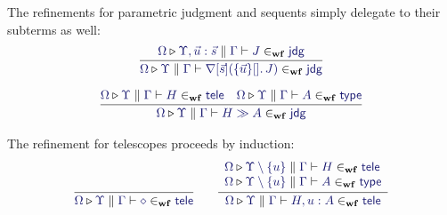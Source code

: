 \documentclass[11pt]{article}
\theoremstyle{definition}
\theoremstyle{remark}
\numberwithin{equation}{section}
\def\IModeColorName{MidnightBlue}
\newcommand\IMode[1]{{\color{\IModeColorName}{#1}}}
\newcommand\MkSet[1]{\left\{#1\right\}}
\newcommand\MkBTm[3]{\{#1\}[#2].\, #3}
\newcommand\IsWf[5]{%
  \IMode{#1}\triangleright%
  \IMode{#2}\parallel%
  \IMode{#3}\vdash%
  \IMode{#4}\in_{\mathbf{wf}}\IMode{#5}%
}
\newcommand\App[2]{#1(#2)}
\begin{document}
The refinements for parametric judgment and sequents simply delegate to their
subterms as well:
\begin{gather*}
  \infer{
    \IsWf{\Omega}{\Upsilon}{\Gamma}{
      \App{\OpNabla{\vec{s}}}{
        \MkBTm{\vec{u}}{}{J}
      }
    }{\SortJdg}
  }{
    \IsWf{\Omega}{\Upsilon,\vec{u}:\vec{s}}{\Gamma}{J}{\SortJdg}
  }\\[6pt]
  \infer{
    \IsWf{\Omega}{\Upsilon}{\Gamma}{
      H\gg A
    }{\SortJdg}
  }{
    \IsWf{\Omega}{\Upsilon}{\Gamma}{H}{\SortTele} &
    \IsWf{\Omega}{\Upsilon}{\Gamma}{A}{\SortType}
  }
\end{gather*}

The refinement for telescopes proceeds by induction:
\begin{gather*}
  \infer{
    \IsWf{\Omega}{\Upsilon}{\Gamma}{\diamond}{\SortTele}
  }{
  }
  \qquad
  \infer{
    \IsWf{\Omega}{\Upsilon}{\Gamma}{H,u:A}{\SortTele}
  }{
    \begin{array}{l}
      \IsWf{\Omega}{\Upsilon\setminus\MkSet{u}}{\Gamma}{H}{\SortTele}\\
      \IsWf{\Omega}{\Upsilon\setminus\MkSet{u}}{\Gamma}{A}{\SortType}
    \end{array}
  }
\end{gather*}

\ifdraft{}{
  \nocite{*}
  
  
}
\end{document}
